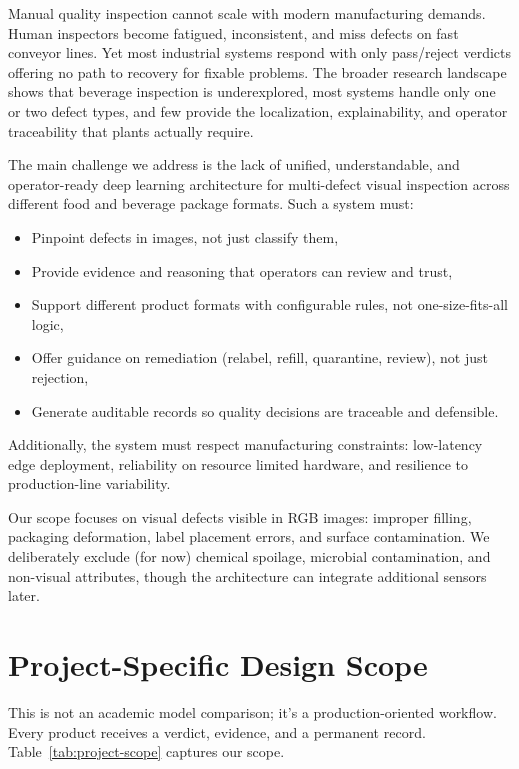 \documentclass[12pt,a4paper]{report}
\begin{document}
Manual quality inspection cannot scale with modern manufacturing demands. Human inspectors become fatigued, inconsistent, and miss defects on fast conveyor lines. Yet most industrial systems respond with only pass/reject verdicts offering no path to recovery for fixable problems. The broader research landscape shows that beverage inspection is underexplored, most systems handle only one or two defect types, and few provide the localization, explainability, and operator traceability that plants actually require.

The main challenge we address is the lack of  unified, understandable, and operator-ready deep learning architecture for multi-defect visual inspection across different food and beverage package formats. Such a system must:

\begin{itemize}
  \item Pinpoint defects in images, not just classify them,
  \item Provide evidence and reasoning that operators can review and trust,
  \item Support different product formats with configurable rules, not one-size-fits-all logic,
  \item Offer guidance on remediation (relabel, refill, quarantine, review), not just rejection,
  \item Generate auditable records so quality decisions are traceable and defensible.
\end{itemize}

Additionally, the system must respect manufacturing constraints: low-latency edge deployment, reliability on resource limited hardware, and resilience to production-line variability.

Our scope focuses on visual defects visible in RGB images: improper filling, packaging deformation, label placement errors, and surface contamination. We deliberately exclude (for now) chemical spoilage, microbial contamination, and non-visual attributes, though the architecture can integrate additional sensors later.

\section{Project-Specific Design Scope}
\label{sec:project-specific-scope}

This is not an academic model comparison; it's a production-oriented workflow. Every product receives a verdict, evidence, and a permanent record. Table~\ref{tab:project-scope} captures our scope.
\end{document}
